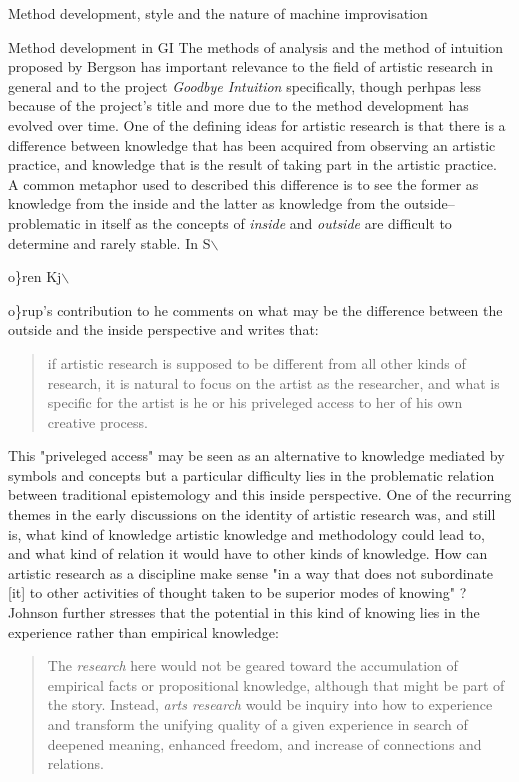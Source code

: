 \documentclass[presentation]{beamer}
\begin{document}
\begin{frame}[label={sec:org08c5441}]{Method development, style and the nature of machine improvisation}
\begin{block}{Method development in GI}
The methods of analysis and the method of intuition proposed by Bergson has important relevance to the field of artistic research in general and to the project \emph{Goodbye Intuition} specifically, though perhpas less because of the project's title and more due to the method development has evolved over time. One of the defining ideas for artistic research is that there is a difference between knowledge that has been acquired from observing an artistic practice, and knowledge that is the result of taking part in the artistic practice. A common metaphor used to described this difference is to see the former as knowledge from the inside and the latter as knowledge from the outside--problematic in itself as the concepts of \emph{inside} and \emph{outside} are difficult to determine and rarely stable. In S$\backslash${o\}ren Kj$\backslash${o\}rup's contribution to  he comments on what may be the difference between the outside and the inside perspective and writes that:

\begin{quote}
if artistic research is supposed to be different from all other kinds of research, it is natural to focus on the artist as the researcher, and what is specific for the artist is he or his priveleged access to her of his own creative process. \citep[p. 25]{kjorup10}
\end{quote}

This "priveleged access" may be seen as an alternative to knowledge mediated by symbols and concepts but a particular difficulty lies in the problematic relation between traditional epistemology and this inside perspective. One of the recurring themes in the early discussions on the identity of artistic research was, and still is, what kind of knowledge artistic knowledge and methodology could lead to, and what kind of relation it would have to other kinds of knowledge. How can artistic research as a discipline make sense "in a way that does not subordinate [it] to other activities of thought taken to be superior modes of knowing" \citep[p. 150]{johnson2010}? Johnson further stresses that the potential in this kind of knowing lies in the experience rather than empirical knowledge:

\begin{quote}
The \emph{research} here would not be geared toward the accumulation of empirical facts or propositional knowledge, although that might be part of the story. Instead, \emph{arts research} would be inquiry into how to experience and transform the unifying quality of a given experience in search of deepened meaning, enhanced freedom, and increase of connections and relations. \citep[p. 150]{johnson2010}
\end{quote}

}}
\end{block}
\end{frame}
\end{document}
